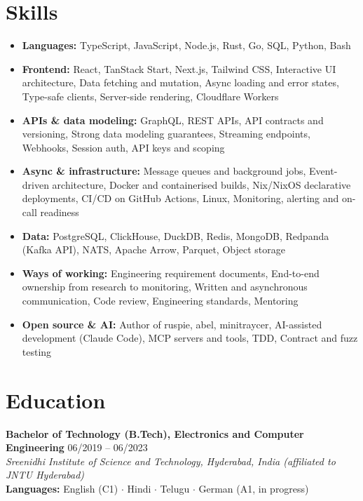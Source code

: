 \documentclass[10pt,a4paper]{article}
\begin{document}
\section*{Skills}
\begin{itemize}[leftmargin=*,label={}]
  \item \textbf{Languages:} TypeScript, JavaScript, Node.js, Rust, Go, SQL, Python, Bash
  \item \textbf{Frontend:} React, TanStack Start, Next.js, Tailwind CSS, Interactive UI architecture, Data fetching and mutation, Async loading and error states, Type-safe clients, Server-side rendering, Cloudflare Workers
  \item \textbf{APIs \& data modeling:} GraphQL, REST APIs, API contracts and versioning, Strong data modeling guarantees, Streaming endpoints, Webhooks, Session auth, API keys and scoping
  \item \textbf{Async \& infrastructure:} Message queues and background jobs, Event-driven architecture, Docker and containerised builds, Nix/NixOS declarative deployments, CI/CD on GitHub Actions, Linux, Monitoring, alerting and on-call readiness
  \item \textbf{Data:} PostgreSQL, ClickHouse, DuckDB, Redis, MongoDB, Redpanda (Kafka API), NATS, Apache Arrow, Parquet, Object storage
  \item \textbf{Ways of working:} Engineering requirement documents, End-to-end ownership from research to monitoring, Written and asynchronous communication, Code review, Engineering standards, Mentoring
  \item \textbf{Open source \& AI:} Author of ruspie, abel, minitraycer, AI-assisted development (Claude Code), MCP servers and tools, TDD, Contract and fuzz testing
\end{itemize}

\section*{Education}
\noindent\textbf{\color{primary}Bachelor of Technology (B.Tech), Electronics and Computer Engineering} \hfill {\small\color{meta}06/2019 -- 06/2023}\\[1.5pt]
\textit{\small Sreenidhi Institute of Science and Technology, Hyderabad, India (affiliated to JNTU Hyderabad)}\\[2.5pt]
{\small \textbf{Languages:} English (C1) $\cdot$ Hindi $\cdot$ Telugu $\cdot$ German (A1, in progress)}
\end{document}
